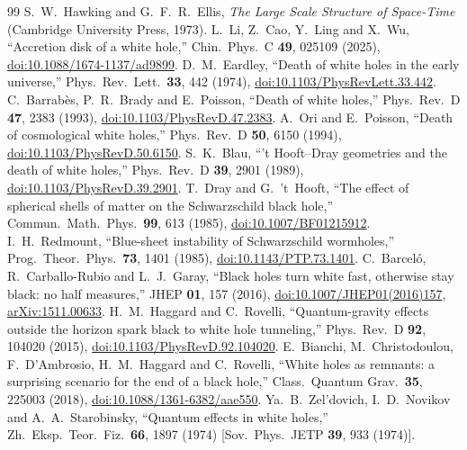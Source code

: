 \documentclass[11pt,a4paper]{article}
\begin{document}
\begin{thebibliography}{99}
 S.~W.~Hawking and G.~F.~R.~Ellis, \emph{The Large Scale Structure of Space-Time} (Cambridge University Press, 1973).
 L.~Li, Z.~Cao, Y.~Ling and X.~Wu, ``Accretion disk of a white hole,'' Chin.\ Phys.\ C \textbf{49}, 025109 (2025), \href{https://doi.org/10.1088/1674-1137/ad9899}{doi:10.1088/1674-1137/ad9899}.
 D.~M.~Eardley, ``Death of white holes in the early universe,'' Phys.\ Rev.\ Lett.\ \textbf{33}, 442 (1974), \href{https://doi.org/10.1103/PhysRevLett.33.442}{doi:10.1103/PhysRevLett.33.442}.
 C.~Barrabès, P.~R.~Brady and E.~Poisson, ``Death of white holes,'' Phys.\ Rev.\ D \textbf{47}, 2383 (1993), \href{https://doi.org/10.1103/PhysRevD.47.2383}{doi:10.1103/PhysRevD.47.2383}.
 A.~Ori and E.~Poisson, ``Death of cosmological white holes,'' Phys.\ Rev.\ D \textbf{50}, 6150 (1994), \href{https://doi.org/10.1103/PhysRevD.50.6150}{doi:10.1103/PhysRevD.50.6150}.
 S.~K.~Blau, ``'t Hooft--Dray geometries and the death of white holes,'' Phys.\ Rev.\ D \textbf{39}, 2901 (1989), \href{https://doi.org/10.1103/PhysRevD.39.2901}{doi:10.1103/PhysRevD.39.2901}.
 T.~Dray and G.~'t~Hooft, ``The effect of spherical shells of matter on the Schwarzschild black hole,'' Commun.\ Math.\ Phys.\ \textbf{99}, 613 (1985), \href{https://doi.org/10.1007/BF01215912}{doi:10.1007/BF01215912}.
 I.~H.~Redmount, ``Blue-sheet instability of Schwarzschild wormholes,'' Prog.\ Theor.\ Phys.\ \textbf{73}, 1401 (1985), \href{https://doi.org/10.1143/PTP.73.1401}{doi:10.1143/PTP.73.1401}.
 C.~Barceló, R.~Carballo-Rubio and L.~J.~Garay, ``Black holes turn white fast, otherwise stay black: no half measures,'' JHEP \textbf{01}, 157 (2016), \href{https://doi.org/10.1007/JHEP01(2016)157}{doi:10.1007/JHEP01(2016)157}, \href{https://arxiv.org/abs/1511.00633}{arXiv:1511.00633}.
 H.~M.~Haggard and C.~Rovelli, ``Quantum-gravity effects outside the horizon spark black to white hole tunneling,'' Phys.\ Rev.\ D \textbf{92}, 104020 (2015), \href{https://doi.org/10.1103/PhysRevD.92.104020}{doi:10.1103/PhysRevD.92.104020}.
 E.~Bianchi, M.~Christodoulou, F.~D'Ambrosio, H.~M.~Haggard and C.~Rovelli, ``White holes as remnants: a surprising scenario for the end of a black hole,'' Class.\ Quantum Grav.\ \textbf{35}, 225003 (2018), \href{https://doi.org/10.1088/1361-6382/aae550}{doi:10.1088/1361-6382/aae550}.
 Ya.~B.~Zel'dovich, I.~D.~Novikov and A.~A.~Starobinsky, ``Quantum effects in white holes,'' Zh.\ Eksp.\ Teor.\ Fiz.\ \textbf{66}, 1897 (1974) [Sov.\ Phys.\ JETP \textbf{39}, 933 (1974)].

\end{thebibliography}
\end{document}
